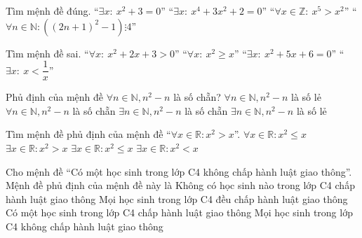 \begin{ex}%
	Tìm mệnh  đề đúng.
	\choice 
		 {“$\exists x: \ x^2+3=0$”}
		 {“$\exists x: \ x^4+3x^2+2=0$”}
		 {“$\forall x\in \mathbb{Z}: \ x^5>x^2$”}
		{\True “$\forall n\in  \mathbb{N} \colon \left((2n+1)^2-1\right)\vdots 4$”}
\end{ex}

\begin{ex}%
	Tìm  mệnh đề sai.
	 \choice
		{“$\forall x:  \ x^2+2x+3>0$”}
		{\True “$\forall x:  \ x^2\geqslant x$”}
		{“$\exists x: \  x^2+5x+6=0$”}
		{“$\exists x: \ x<\dfrac{1}x$”} 
\end{ex}

\begin{ex}%
	 Phủ định của mệnh đề $\forall n \in \mathbb{N},n^2-n$ là số chẵn?
	 \choice
		{$\forall n \in \mathbb{N},n^2-n$ là số  lẻ}
		 {$\forall n \in \mathbb{N},n^2-n$ là số chẵn}
		{$\exists n  \in \mathbb{N},n^2-n$ là số chẵn}
		{\True $\exists n  \in \mathbb{N},n^2-n$ là số lẻ}
\end{ex}

\begin{ex}%
	Tìm mệnh đề phủ định của mệnh đề “$ \forall x\in \mathbb{R}\colon x^2>x$”. 
	\choice 
		 {$\forall x\in \mathbb{R}\colon x^2\leqslant x$}
		{$\exists  x\in \mathbb{R}\colon x^2>x$}
		{\True $\exists x\in  \mathbb{R}\colon x^2\leqslant x$}
		{$\exists x\in \mathbb{R}\colon  x^2<x$}
\end{ex}

\begin{ex}%
	Cho mệnh đề “Có một học sinh trong lớp C4  không chấp hành luật giao thông”. Mệnh đề phủ định của mệnh đề này là
	 \choice
		{Không có học sinh nào trong lớp C4  chấp hành luật giao thông}
		{\True Mọi học sinh trong lớp C4  đều chấp hành luật giao thông}
		{Có một học sinh trong lớp C4 chấp hành luật  giao thông}
		{Mọi học sinh trong  lớp C4 không chấp hành luật giao thông}
\end{ex}

